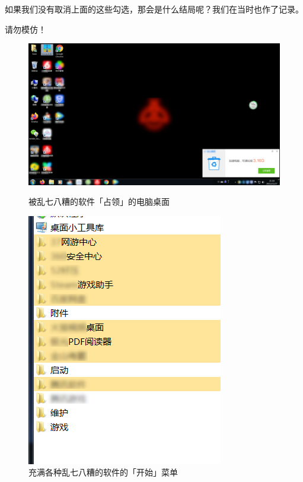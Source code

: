 {{如果我们没有取消上面的这些勾选，那会是什么结局呢？我们在当时也作了记录。

\begin{dangerbox}
  请勿模仿！
\end{dangerbox}

\begin{figure}[htb!]
  \centering
  \begin{minipage}{.65\textwidth}
    \centering
    \includegraphics[width=.9\textwidth]{assets/basic/Computer_with_unwanted_software.png}
    \caption{被乱七八糟的软件「占领」的电脑桌面}
    \label{fig:Computer_with_unwanted_software}
  \end{minipage}
  \begin{minipage}{.34\textwidth}
    \centering
    \includegraphics[width=.9\textwidth]{assets/basic/Computer_with_unwanted_software_2.png}
    \caption{充满各种乱七八糟的软件的「开始」菜单}
    \label{fig:Computer_with_unwanted_software_2}
  \end{minipage} 
\end{figure}

}}
